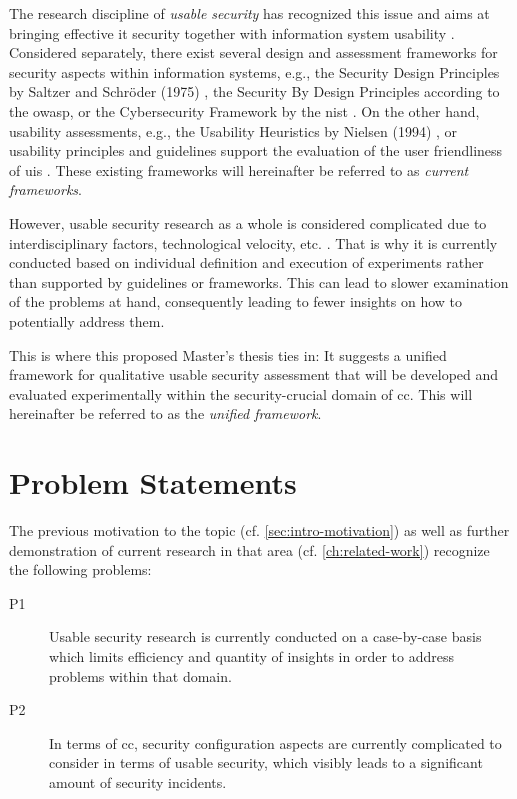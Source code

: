 The research discipline of \textit{usable security} has recognized this issue and aims at bringing effective \ac{it} security together with information system usability \cite{garfinkel_usable_2014}. Considered separately, there exist several  design and assessment frameworks for security aspects within information systems, e.g., the Security Design Principles by Saltzer and Schröder (1975) \cite{saltzer_protection_1975}, the Security By Design Principles according to the \ac{owasp}, or the Cybersecurity Framework by the \ac{nist} \cite{noauthor_framework_2018}. On the other hand, usability assessments, e.g., the Usability Heuristics by Nielsen (1994) \cite{nielsen_10_1994}, or usability principles and guidelines support the evaluation of the user friendliness of \acp{ui} \cite{moran_usability_2019}. These existing frameworks will hereinafter be referred to as \textit{current frameworks}.

However, usable security research as a whole is considered complicated due to interdisciplinary factors, technological velocity, etc. \cite{garfinkel_usable_2014}. That is why it is currently conducted based on individual definition and execution of experiments rather than supported by guidelines or frameworks. This can lead to slower examination of the problems at hand, consequently leading to fewer insights on how to potentially address them.

This is where this proposed Master's thesis ties in: It suggests a unified framework for qualitative usable security assessment that will be developed and evaluated experimentally within the security-crucial domain of \ac{cc}. This will hereinafter be referred to as the \textit{unified framework}.

\section{Problem Statements} \label{sec:intro-problems}

The previous motivation to the topic (cf. \autoref{sec:intro-motivation}) as well as further demonstration of current research in that area (cf. \autoref{ch:related-work}) recognize the following problems:

\begin{description}
	\item[P1] Usable security research is currently conducted on a case-by-case basis which limits efficiency and quantity of insights in order to address problems within that domain.
	\item[P2] In terms of \ac{cc}, security configuration aspects are currently complicated to consider in terms of usable security, which visibly leads to a significant amount of security incidents.
\end{description}

